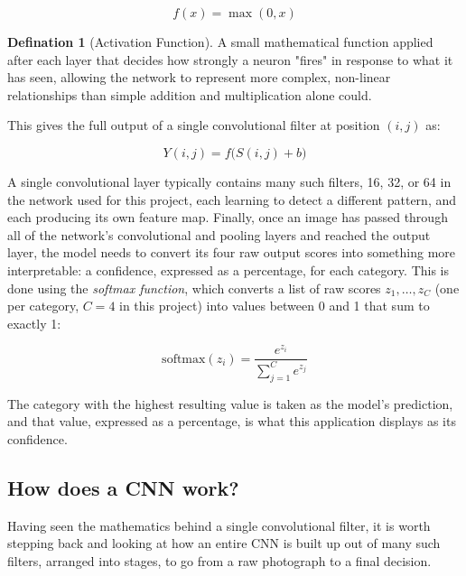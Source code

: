 \documentclass[11 pt , a 4 paper ]{article}
\theoremstyle{definition}
\newtheorem{thm}{Defination}
\begin{document}
\begin{equation}
f(x) = \max(0, x)
\end{equation}
 
\begin{thm}[Activation Function]
A small mathematical function applied after each layer that decides how strongly a neuron "fires" in response to what it has seen, allowing the network to represent more complex, non-linear relationships than simple addition and multiplication alone could.
\end{thm}
 
\noindent This gives the full output of a single convolutional filter at position $(i,j)$ as:
 
\begin{equation}
Y(i,j) = f\Big( S(i,j) + b \Big)
\end{equation}
 
\noindent A single convolutional layer typically contains many such filters, 16, 32, or 64 in the network used for this project, each learning to detect a different pattern, and each producing its own feature map. Finally, once an image has passed through all of the network's convolutional and pooling layers and reached the output layer, the model needs to convert its four raw output scores into something more interpretable: a confidence, expressed as a percentage, for each category. This is done using the \emph{softmax function}, which converts a list of raw scores $z_1, \ldots, z_C$ (one per category, $C = 4$ in this project) into values between 0 and 1 that sum to exactly 1:
 
\begin{equation}
\text{softmax}(z_i) = \frac{e^{z_i}}{\displaystyle\sum_{j=1}^{C} e^{z_j}}
\end{equation}
 
\noindent The category with the highest resulting value is taken as the model's prediction, and that value, expressed as a percentage, is what this application displays as its confidence.
 
\subsection{How does a CNN work?}
 
\noindent Having seen the mathematics behind a single convolutional filter, it is worth stepping back and looking at how an entire CNN is built up out of many such filters, arranged into stages, to go from a raw photograph to a final decision.\\
 
\end{document}
